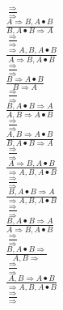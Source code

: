\documentclass[11pt]{article}
\begin{document}
\begin{center}
\bigskip
\\$\frac{\Rightarrow }{\Rightarrow }$
\bigskip
\\$\frac{A\Rightarrow B, A\bullet B}{B, A\bullet B\Rightarrow A}$
\bigskip
\\$\frac{\Rightarrow }{\Rightarrow }$
\bigskip
\\$\frac{\Rightarrow A, B, A\bullet B}{A\Rightarrow B, A\bullet B}$
\bigskip
\\$\frac{\Rightarrow }{\Rightarrow }$
\bigskip
\\$\frac{B\Rightarrow A\bullet B}{B\Rightarrow A}$
\bigskip
\\$\frac{\Rightarrow }{\Rightarrow }$
\bigskip
\\$\frac{B, A\bullet B\Rightarrow A}{A, B\Rightarrow A\bullet B}$
\bigskip
\\$\frac{\Rightarrow }{\Rightarrow }$
\bigskip
\\$\frac{A, B\Rightarrow A\bullet B}{B, A\bullet B\Rightarrow A}$
\bigskip
\\$\frac{\Rightarrow }{\Rightarrow }$
\bigskip
\\$\frac{A\Rightarrow B, A\bullet B}{\Rightarrow A, B, A\bullet B}$
\bigskip
\\$\frac{\Rightarrow }{\Rightarrow }$
\bigskip
\\$\frac{B, A\bullet B\Rightarrow A}{\Rightarrow A, B, A\bullet B}$
\bigskip
\\$\frac{\Rightarrow }{\Rightarrow }$
\bigskip
\\$\frac{B, A\bullet B\Rightarrow A}{A\Rightarrow B, A\bullet B}$
\bigskip
\\$\frac{\Rightarrow }{\Rightarrow }$
\bigskip
\\$\frac{B, A\bullet B\Rightarrow }{A, B\Rightarrow }$
\bigskip
\\$\frac{\Rightarrow }{\Rightarrow }$
\bigskip
\\$\frac{A, B\Rightarrow A\bullet B}{\Rightarrow A, B, A\bullet B}$
\bigskip
\\$\frac{\Rightarrow }{\Rightarrow }$
\bigskip
\\
\end{center}
\end{document}
